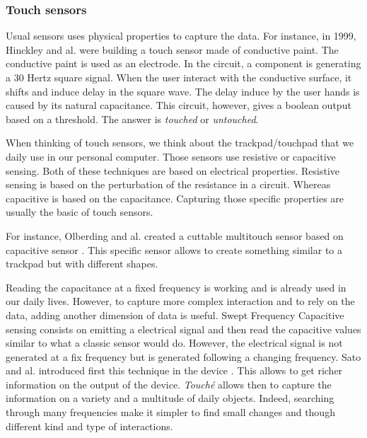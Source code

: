 \subsubsection{Touch sensors}

Usual sensors uses physical properties to capture the data. For instance, in 1999, Hinckley and al. \cite{hinckleyTouchsensingInputDevices1999}
were building a touch sensor made of conductive paint. The conductive paint is used as an electrode.
In the circuit, a component is generating a 30 Hertz square signal. When the user interact with the conductive surface,
it shifts and induce delay in the square wave. The delay induce by the user hands is caused by its natural
capacitance. This circuit, however, gives a boolean output based on a threshold. The answer is \textit{touched}
or \textit{untouched}. %

When thinking of touch sensors, we think about the trackpad/touchpad that we daily use in our personal
computer. Those sensors use resistive or capacitive sensing. Both of these techniques are based on electrical
properties. Resistive sensing is based on the perturbation of the resistance in a circuit. Whereas
capacitive is based on the capacitance. Capturing those specific properties are usually the basic of
touch sensors.

For instance, Olberding and al. created a cuttable multitouch sensor based on capacitive sensor \cite{olberdingCuttableMultitouchSensor2013}.
This specific sensor allows to create something similar to a trackpad but with different shapes.

Reading the capacitance at a fixed frequency is working and is already used in our daily lives.
However, to capture more complex interaction and to rely on the data, adding another dimension of data is useful.
Swept Frequency Capacitive sensing consists on emitting a electrical signal and then read the capacitive values
similar to what a classic sensor would do. However, the electrical signal is not generated at a fix frequency
but is generated following a changing frequency.
Sato and al. introduced first this technique in the  device \cite{satoToucheEnhancingTouch2012}.
This allows to get richer information on the output of the device. \textit{Touché} allows then to capture
the information on a variety and a multitude of daily objects.
Indeed, searching through many frequencies make it simpler to find small changes and though different kind and type
of interactions.

